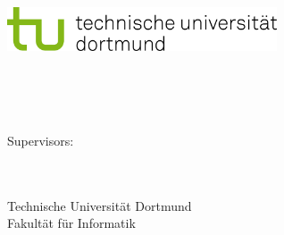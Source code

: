 \begin{titlepage}
\vspace*{-2cm}
\newlength{\links}
\setlength{\links}{-1.5cm}
\sffamily
\hspace*{\links}
\begin{minipage}{12.5cm}
\includegraphics[width=8cm]{bilder/tud_logo_rgb}
\end{minipage}

\vspace*{4cm}

\begin{center}
\begin{minipage}{9cm}
\large
\centering
{\Large \type} \\
\vspace*{1cm}
\textbf{\thesistitle} \\
\vspace*{1cm}
\Autor \\
\submissiondate
\end{minipage}
\end{center}
\normalsize

\vspace*{5cm}



\vspace*{2.1cm}

\hspace*{\links}
\begin{minipage}[b]{8cm}
\raggedright
Supervisors: \\
\firstsupervisor \\
\secondsupervisor \\
\end{minipage}

\vspace*{2.5cm}
\hspace*{\links}
\begin{minipage}[b]{8cm}
\raggedright
Technische Universit\"at Dortmund \\
Fakult\"at f\"ur Informatik\\
\ErstLehrstuhl
\end{minipage}


\end{titlepage}